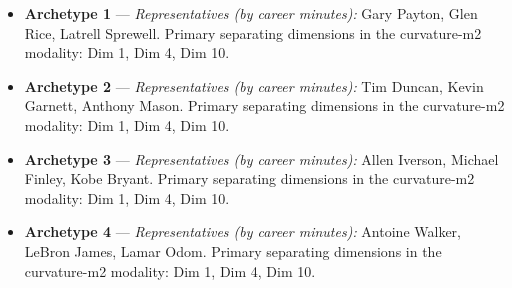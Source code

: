 \begin{itemize}
\item \textbf{Archetype 1} --- \emph{Representatives (by career minutes):} Gary Payton, Glen Rice, Latrell Sprewell. Primary separating dimensions in the curvature-m2 modality: Dim 1, Dim 4, Dim 10.
\item \textbf{Archetype 2} --- \emph{Representatives (by career minutes):} Tim Duncan, Kevin Garnett, Anthony Mason. Primary separating dimensions in the curvature-m2 modality: Dim 1, Dim 4, Dim 10.
\item \textbf{Archetype 3} --- \emph{Representatives (by career minutes):} Allen Iverson, Michael Finley, Kobe Bryant. Primary separating dimensions in the curvature-m2 modality: Dim 1, Dim 4, Dim 10.
\item \textbf{Archetype 4} --- \emph{Representatives (by career minutes):} Antoine Walker, LeBron James, Lamar Odom. Primary separating dimensions in the curvature-m2 modality: Dim 1, Dim 4, Dim 10.
\end{itemize}

